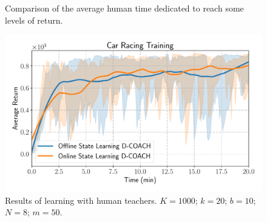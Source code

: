 \begin{figure}[H]
\centering
{}
\caption{Comparison of the average human time dedicated to reach some levels of return.} 
\label{fig:stacked_bar} 
\end{figure}

\begin{figure}[H]
    \centering
    \includegraphics[width=0.9\linewidth]{imagenes/cap3/car_racing_human_teacher_ICRA.pdf}
    \caption{Results of learning with human teachers. $K = 1000$; $k=20$; $b = 10$; $N = 8$; $m=50$.}
    \label{fig:humanteachers1}
\end{figure}

